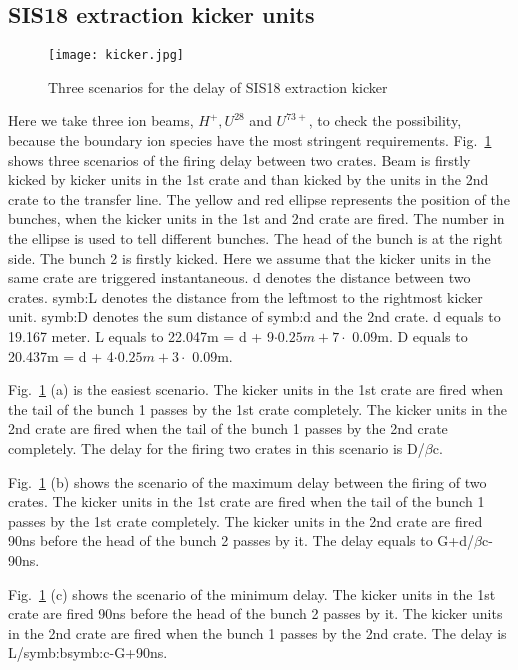 \subsection{SIS18 extraction kicker units}
\begin{figure}[H]
   \centering   
   \texttt{[image: kicker.jpg]}
   \caption{Three scenarios for the delay of SIS18 extraction kicker}
   \label{kicker}
\end{figure}
Here we take three ion beams, $H^+, U^{28}$ and $U^{73+}$, to check the possibility, because the boundary ion species have the most stringent requirements. Fig.~\ref{kicker} shows three scenarios of the firing delay between two crates. Beam is firstly kicked by kicker units in the 1st crate and than kicked by the units in the 2nd crate to the transfer line. The yellow and red ellipse represents the position of the bunches, when the kicker units in the 1st and 2nd crate are fired. The number in the ellipse is used to tell different bunches. The head of the bunch is at the right side. The bunch 2 is firstly kicked. Here we assume that the kicker units in the same crate are triggered instantaneous. d denotes the distance between two crates. \gls{symb:L} denotes the distance from the leftmost to the rightmost kicker unit. \gls{symb:D} denotes the sum distance of \gls{symb:d} and the 2nd crate. d equals to 19.167 meter. L equals to 22.047m = d + 9$\cdot 0.25m + 7\cdot$ 0.09m. D equals to 20.437m = d + 4$\cdot 0.25m + 3\cdot$ 0.09m.

Fig.~\ref{kicker} (a) is the easiest scenario. The kicker units in the 1st crate are fired when the tail of the bunch 1 passes by the 1st crate completely. The kicker units in the 2nd crate are fired when the tail of the bunch 1 passes by the 2nd crate completely. The delay for the firing two crates in this scenario is D/$\beta$c. 

Fig.~\ref{kicker} (b) shows the scenario of the maximum delay between the firing of two crates. The kicker units in the 1st crate are fired when the tail of the bunch 1 passes by the 1st crate completely. The kicker units in the 2nd crate are fired 90ns before the head of the bunch 2 passes by it. The delay equals to G+d/$\beta$c-90ns.

Fig.~\ref{kicker} (c) shows the scenario of the minimum delay. The kicker units in the 1st crate are fired 90ns before the head of the bunch 2 passes by it. The kicker units in the 2nd crate are fired when the bunch 1 passes by the 2nd crate. The delay is L/\gls{symb:b}\gls{symb:c}-G+90ns.



